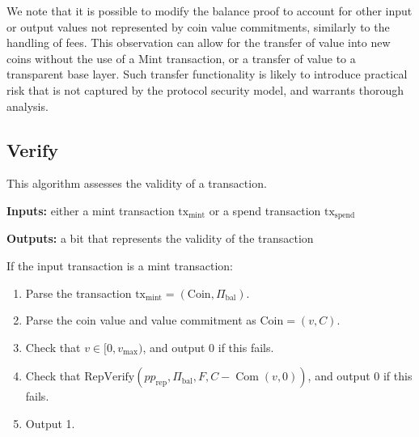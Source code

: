 \documentclass{llncs}
\newcommand{\com}{\operatorname{Com}}
\begin{document}
\begin{remark}
We note that it is possible to modify the balance proof to account for other input or output values not represented by coin value commitments, similarly to the handling of fees.
This observation can allow for the transfer of value into new coins without the use of a $\text{Mint}$ transaction, or a transfer of value to a transparent base layer.
Such transfer functionality is likely to introduce practical risk that is not captured by the protocol security model, and warrants thorough analysis.
\end{remark}


\subsection{Verify}

This algorithm assesses the validity of a transaction.

\textbf{Inputs:} either a mint transaction $\text{tx}_{\text{mint}}$ or a spend transaction $\text{tx}_{\text{spend}}$

\textbf{Outputs:} a bit that represents the validity of the transaction

If the input transaction is a mint transaction:
\begin{enumerate}
    \item Parse the transaction $\text{tx}_{\text{mint}} = (\text{Coin}, \Pi_{\text{bal}})$.
    \item Parse the coin value and value commitment as $\text{Coin} = (v, C)$.
    \item Check that $v \in [0,v_{\text{max}})$, and output 0 if this fails.
    \item Check that $\text{RepVerify}(pp_{\text{rep}},\Pi_{\text{bal}},F,C - \com(v,0))$, and output 0 if this fails.
    \item Output 1.
\end{enumerate}
\end{document}
